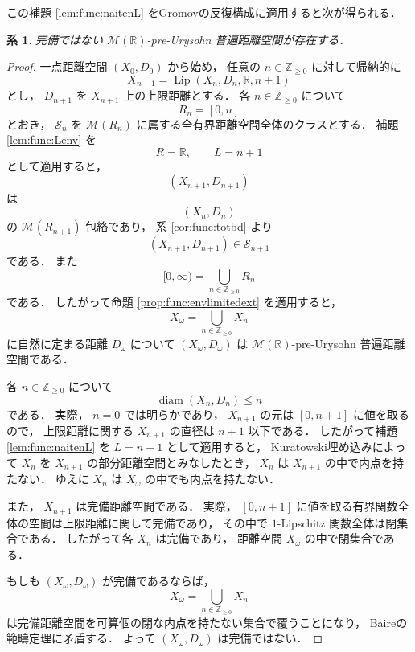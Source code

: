 \documentclass[leqno, 12pt]{jsarticle}
\newtheorem{cor}[thm]{系}
\newcommand{\zz}{\mathbb{Z}}
\newcommand{\yozz}[1]{\zz_{\ge #1}}
\newcommand{\rr}{\mathbb{R}}
\DeclareMathOperator{\di}{diam}
\DeclareMathOperator{\lip}{Lip}
\newcommand{\Met}[1]{\mathscr{M}(#1)}
\newcommand{\LipSpace}[4]{\lip(#1,#2,#3,#4)}
\begin{document}
この補題
\ref{lem:func:naitenL}
をGromovの反復構成に適用すると次が得られる．
\begin{cor}\label{cor:noncomp2}
完備ではない
$\Met{\rr}$-pre-Urysohn
普遍距離空間が存在する．
\end{cor}
\begin{proof}
一点距離空間
$(X_0,D_0)$
から始め，
任意の
$n\in\yozz{0}$
に対して帰納的に
\[
X_{n+1}=\LipSpace{X_n}{D_n}{\rr}{n+1}
\]
とし，
$D_{n+1}$
を
$X_{n+1}$
上の上限距離とする．
各
$n\in\yozz{0}$
について
\[
R_n=[0,n]
\]
とおき，
$\mathscr S_n$
を
$\Met{R_n}$
に属する全有界距離空間全体のクラスとする．
補題
\ref{lem:func:Lenv}
を
\[
R=\rr,
\qquad
L=n+1
\]
として適用すると，
\[
(X_{n+1},D_{n+1})
\]
は
\[
(X_n,D_n)
\]
の
$\Met{R_{n+1}}$-包絡であり，
系
\ref{cor:func:totbd}
より
\[
(X_{n+1},D_{n+1})\in\mathscr S_{n+1}
\]
である．
また
\[
[0,\infty)=\bigcup_{n\in\yozz{0}}R_n
\]
である．
したがって命題
\ref{prop:func:envlimitedext}
を適用すると，
\[
X_\omega=\bigcup_{n\in\yozz{0}}X_n
\]
に自然に定まる距離
$D_\omega$
について
$(X_\omega,D_\omega)$
は
$\Met{\rr}$-pre-Urysohn
普遍距離空間である．

各
$n\in\yozz{0}$
について
\[
\di(X_n,D_n)\le n
\]
である．
実際，
$n=0$
では明らかであり，
$X_{n+1}$
の元は
$[0,n+1]$
に値を取るので，
上限距離に関する
$X_{n+1}$
の直径は
$n+1$
以下である．
したがって補題
\ref{lem:func:naitenL}
を
$L=n+1$
として適用すると，
Kuratowski埋め込みによって
$X_n$
を
$X_{n+1}$
の部分距離空間とみなしたとき，
$X_n$
は
$X_{n+1}$
の中で内点を持たない．
ゆえに
$X_n$
は
$X_\omega$
の中でも内点を持たない．

また，
$X_{n+1}$
は完備距離空間である．
実際，
$[0,n+1]$
に値を取る有界関数全体の空間は上限距離に関して完備であり，
その中で
$1$-Lipschitz
関数全体は閉集合である．
したがって各
$X_n$
は完備であり，
距離空間
$X_\omega$
の中で閉集合である．

もしも
$(X_\omega,D_\omega)$
が完備であるならば，
\[
X_\omega=\bigcup_{n\in\yozz{0}}X_n
\]
は完備距離空間を可算個の閉な内点を持たない集合で覆うことになり，
Baireの範疇定理に矛盾する．
よって
$(X_\omega,D_\omega)$
は完備ではない．
\end{proof}
\end{document}
